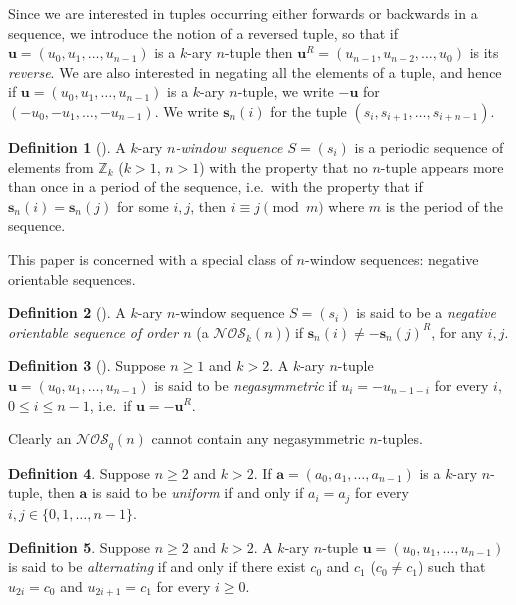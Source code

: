 \documentclass[a4paper,11pt]{article}
\theoremstyle{plain}
\theoremstyle{definition}
\newtheorem{definition}{Definition}[section]
\theoremstyle{remark}
\begin{document}
Since we are interested in tuples occurring either forwards or backwards in a sequence, we
introduce the notion of a reversed tuple, so that if $\mathbf{u} = (u_0,u_1,\ldots,u_{n-1})$ is a
$k$-ary $n$-tuple then $\mathbf{u}^R = (u_{n-1},u_{n-2}, \ldots,u_0)$ is its \emph{reverse}.  We
are also interested in negating all the elements of a tuple, and hence if $\mathbf{u} =
(u_0,u_1,\ldots,u_{n-1})$ is a $k$-ary $n$-tuple, we write $-\mathbf{u}$ for
$(-u_0,-u_1,\ldots,-u_{n-1})$. We write $\mathbf{s}_n(i)$ for the tuple
$(s_i,s_{i+1},\ldots,s_{i+n-1})$.

\begin{definition}[\cite{Alhakim24a}]
A $k$-ary \emph{$n$-window sequence $S = (s_i)$} is a periodic sequence of elements from
$\mathbb{Z}_k$ ($k>1$, $n>1$) with the property that no $n$-tuple appears more than once in a
period of the sequence, i.e.\ with the property that if $\mathbf{s}_n(i) = \mathbf{s}_n(j)$ for
some $i,j$, then $i \equiv j \pmod m$ where $m$ is the period of the sequence.
\end{definition}

This paper is concerned with a special class of $n$-window sequences: negative orientable
sequences.

\begin{definition}[\cite{Alhakim24a}]  \label{definition:NOS}
A $k$-ary $n$-window sequence $S=(s_i)$ is said to be a \emph{negative orientable sequence of order
$n$} (a $\mathcal{NOS}_k(n)$) if $\mathbf{s}_n(i)\not=-{\mathbf{s}_n(j)}^R$, for any $i,j$.
\end{definition}



\begin{definition}[\cite{Mitchell25a}]
Suppose $n\geq 1$ and $k>2$.  A $k$-ary $n$-tuple $\mathbf{u}=(u_0,u_1,\dots,u_{n-1})$ is said
to be \emph{negasymmetric} if $u_i=-u_{n-1-i}$ for every $i$, $0\leq i\leq n-1$, i.e.\ if
$\mathbf{u}=-\mathbf{u}^R$.
\end{definition}

Clearly an $\mathcal{NOS}_q(n)$ cannot contain any negasymmetric $n$-tuples.

\begin{definition}
Suppose $n\geq2$ and $k>2$.  If $\mathbf{a}=(a_0,a_1,\ldots,a_{n-1})$ is a $k$-ary $n$-tuple,
then $\mathbf{a}$ is said to be \emph{uniform} if and only if $a_i=a_j$ for every $i,j\in
\{0,1,\ldots,n-1\}$.
\end{definition}

\begin{definition}
Suppose $n\geq2$ and $k>2$.  A $k$-ary $n$-tuple $\mathbf{u}=(u_0,u_1,\ldots,u_{n-1})$ is said
to be \emph{alternating} if and only if there exist $c_0$ and $c_1$ ($c_0\neq c_1$) such that
$u_{2i}=c_0$ and $u_{2i+1}=c_1$ for every $i\geq0$.
\end{definition}
\end{document}
